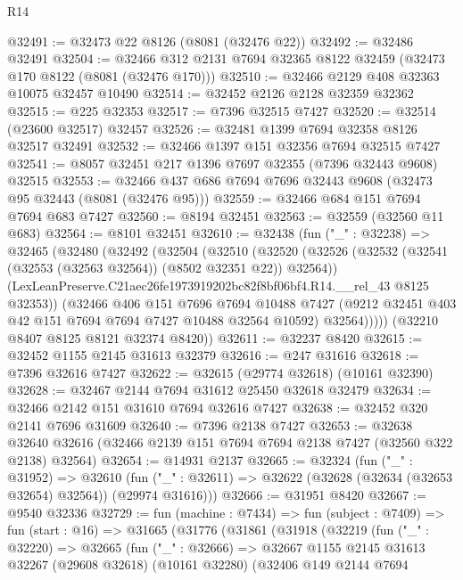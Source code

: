 \begin{lexlean}{R14}
\begin{coremodule}
@32491 := @32473 @22 @8126 (@8081 (@32476 @22))
@32492 := @32486 @32491
@32504 := @32466 @312 @2131 @7694 @32365 @8122 @32459 (@32473 @170 @8122 (@8081 (@32476 @170)))
@32510 := @32466 @2129 @408 @32363 @10075 @32457 @10490
@32514 := @32452 @2126 @2128 @32359 @32362
@32515 := @225 @32353
@32517 := @7396 @32515 @7427
@32520 := @32514 (@23600 @32517) @32457
@32526 := @32481 @1399 @7694 @32358 @8126 @32517 @32491
@32532 := @32466 @1397 @151 @32356 @7694 @32515 @7427
@32541 := @8057 @32451 @217 @1396 @7697 @32355 (@7396 @32443 @9608) @32515
@32553 := @32466 @437 @686 @7694 @7696 @32443 @9608 (@32473 @95 @32443 (@8081 (@32476 @95)))
@32559 := @32466 @684 @151 @7694 @7694 @683 @7427
@32560 := @8194 @32451
@32563 := @32559 (@32560 @11 @683)
@32564 := @8101 @32451
@32610 := @32438
    (fun ("_" : @32238) =>
    @32465
      (@32480
        (@32492
          (@32504
            (@32510
              (@32520
                (@32526 (@32532 (@32541 (@32553 (@32563 @32564)) (@8502 @32351 @22)) @32564))
                (LexLeanPreserve.C21aec26fe1973919202bc82f8bf06bf4.R14.__rel_43 @8125 @32353))
              (@32466
                @406
                @151
                @7696
                @7694
                @10488
                @7427
                (@9212 @32451 @403 @42 @151 @7694 @7694 @7427 @10488 @32564 @10592)
                @32564)))))
      (@32210 @8407 @8125 @8121 @32374 @8420))
@32611 := @32237 @8420
@32615 := @32452 @1155 @2145 @31613 @32379
@32616 := @247 @31616
@32618 := @7396 @32616 @7427
@32622 := @32615 (@29774 @32618) (@10161 @32390)
@32628 := @32467 @2144 @7694 @31612 @25450 @32618 @32479
@32634 := @32466 @2142 @151 @31610 @7694 @32616 @7427
@32638 := @32452 @320 @2141 @7696 @31609
@32640 := @7396 @2138 @7427
@32653 := @32638
    @32640
    @32616
    (@32466 @2139 @151 @7694 @7694 @2138 @7427 (@32560 @322 @2138) @32564)
@32654 := @14931 @2137
@32665 := @32324
    (fun ("_" : @31952) =>
    @32610 (fun ("_" : @32611) => @32622 (@32628 (@32634 (@32653 @32654) @32564)) (@29974 @31616)))
@32666 := @31951 @8420
@32667 := @9540 @32336
@32729 := fun (machine : @7434) =>
  fun (subject : @7409) =>
  fun (start : @16) =>
  @31665
    (@31776
      (@31861
        (@31918
          (@32219
            (fun ("_" : @32220) =>
            @32665
              (fun ("_" : @32666) =>
              @32667
                @1155
                @2145
                @31613
                @32267
                (@29608 @32618)
                (@10161 @32280)
                (@32406
                  @149
                  @2144
                  @7694

\end{coremodule}
\end{lexlean}
